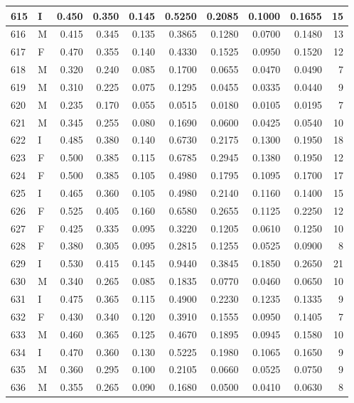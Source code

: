 \documentclass[9pt,twocolumn,twoside,]{pnas-new}
\begin{document}
\begin{tabular}{l|l|r|r|r|r|r|r|r|r}
\hline
615 & I & 0.450 & 0.350 & 0.145 & 0.5250 & 0.2085 & 0.1000 & 0.1655 & 15\\
\hline
616 & M & 0.415 & 0.345 & 0.135 & 0.3865 & 0.1280 & 0.0700 & 0.1480 & 13\\
\hline
617 & F & 0.470 & 0.355 & 0.140 & 0.4330 & 0.1525 & 0.0950 & 0.1520 & 12\\
\hline
618 & M & 0.320 & 0.240 & 0.085 & 0.1700 & 0.0655 & 0.0470 & 0.0490 & 7\\
\hline
619 & M & 0.310 & 0.225 & 0.075 & 0.1295 & 0.0455 & 0.0335 & 0.0440 & 9\\
\hline
620 & M & 0.235 & 0.170 & 0.055 & 0.0515 & 0.0180 & 0.0105 & 0.0195 & 7\\
\hline
621 & M & 0.345 & 0.255 & 0.080 & 0.1690 & 0.0600 & 0.0425 & 0.0540 & 10\\
\hline
622 & I & 0.485 & 0.380 & 0.140 & 0.6730 & 0.2175 & 0.1300 & 0.1950 & 18\\
\hline
623 & F & 0.500 & 0.385 & 0.115 & 0.6785 & 0.2945 & 0.1380 & 0.1950 & 12\\
\hline
624 & F & 0.500 & 0.385 & 0.105 & 0.4980 & 0.1795 & 0.1095 & 0.1700 & 17\\
\hline
625 & I & 0.465 & 0.360 & 0.105 & 0.4980 & 0.2140 & 0.1160 & 0.1400 & 15\\
\hline
626 & F & 0.525 & 0.405 & 0.160 & 0.6580 & 0.2655 & 0.1125 & 0.2250 & 12\\
\hline
627 & F & 0.425 & 0.335 & 0.095 & 0.3220 & 0.1205 & 0.0610 & 0.1250 & 10\\
\hline
628 & F & 0.380 & 0.305 & 0.095 & 0.2815 & 0.1255 & 0.0525 & 0.0900 & 8\\
\hline
629 & I & 0.530 & 0.415 & 0.145 & 0.9440 & 0.3845 & 0.1850 & 0.2650 & 21\\
\hline
630 & M & 0.340 & 0.265 & 0.085 & 0.1835 & 0.0770 & 0.0460 & 0.0650 & 10\\
\hline
631 & I & 0.475 & 0.365 & 0.115 & 0.4900 & 0.2230 & 0.1235 & 0.1335 & 9\\
\hline
632 & F & 0.430 & 0.340 & 0.120 & 0.3910 & 0.1555 & 0.0950 & 0.1405 & 7\\
\hline
633 & M & 0.460 & 0.365 & 0.125 & 0.4670 & 0.1895 & 0.0945 & 0.1580 & 10\\
\hline
634 & I & 0.470 & 0.360 & 0.130 & 0.5225 & 0.1980 & 0.1065 & 0.1650 & 9\\
\hline
635 & M & 0.360 & 0.295 & 0.100 & 0.2105 & 0.0660 & 0.0525 & 0.0750 & 9\\
\hline
636 & M & 0.355 & 0.265 & 0.090 & 0.1680 & 0.0500 & 0.0410 & 0.0630 & 8\\

\end{tabular}
\end{document}
